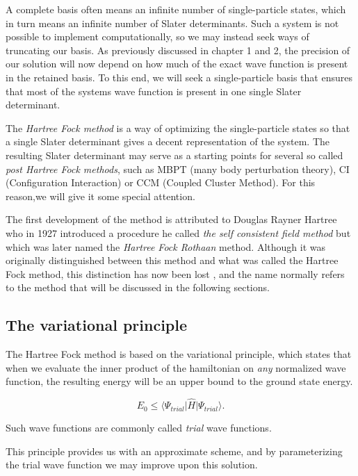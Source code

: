 A complete basis often means an infinite number of single-particle states, which in turn means an infinite number of Slater determinants. Such a system is not possible to implement computationally, so we may instead seek ways of truncating our basis. As previously discussed in chapter 1 and 2, the precision of our solution will now depend on how much of the exact wave function is present in the retained basis. To this end, we will seek a single-particle basis that ensures that most of the systems wave function is present in one single Slater determinant.

The \emph{Hartree Fock method} is a way of optimizing the single-particle states so that a single Slater determinant gives a decent representation of the system. The resulting Slater determinant may serve as a starting points for several so called \emph{post Hartree Fock methods}, such as MBPT (many body perturbation theory), CI (Configuration Interaction) or CCM (Coupled Cluster Method). \cite{ShavittBartlett2009} For this reason,we will give it some special attention.

The first development of the method is attributed to Douglas Rayner Hartree who in 1927 introduced a procedure he called \emph{the self consistent field method} \cite{Thijssen} but which was later named the \emph{Hartree Fock Rothaan} method. Although it was originally distinguished between this method and what was called the Hartree Fock method, this distinction has now been lost \cite{ShavittBartlett2009}, and the name normally refers to the method that will be discussed in the following sections.

\subsection{The variational principle}

The Hartree Fock method is based on the variational principle, which states that when we evaluate the inner product of the hamiltonian on \emph{any} normalized wave function, the resulting energy will be an upper bound to the ground state energy. \cite{Griffiths2005}

\begin{equation}
E_0 \leq \langle \Psi_{trial} \vert \hat{H} \vert \Psi_{trial} \rangle.
\label{eqn:variational}
\end{equation}

Such wave functions are commonly called \emph{trial} wave functions. 

This principle provides us with an approximate scheme, and by parameterizing the trial wave function we may improve upon this solution.

